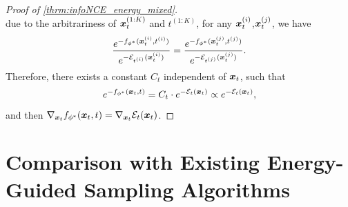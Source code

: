 \begin{proof}[Proof of \cref{thrm:infoNCE_energy_mixed}]
\begin{equation*}
\end{equation*}
due to the arbitrariness of ${\bm{x}}_t^{(1:K)}$ and $t^{(1:K)}$, for any ${\bm{x}}_t^{(i)}$,${\bm{x}}_t^{(j)}$, we have
\begin{equation*}
    \frac{e^{-f_{\phi^*}({\bm{x}}_t^{(i)},t^{(i)})}}{e^{-{\mathcal{E}}_{t^{(i)}}({\bm{x}}_t^{(i)})}} = \frac{e^{-f_{\phi^*}({\bm{x}}_t^{(j)},t^{(j)})}}{e^{-{\mathcal{E}}_{t^{(j)}}({\bm{x}}_t^{(j)})}}.
\end{equation*}
Therefore, there exists a constant $C_t$ independent of ${\bm{x}}_t$, such that
\begin{equation*}
    e^{-f_{\phi^*}({\bm{x}}_t,t)} = C_t \cdot e^{-{\mathcal{E}}_t({\bm{x}}_t)} \propto e^{-{\mathcal{E}}_t({\bm{x}}_t)},
\end{equation*}
and then $\nabla_{{\bm{x}}_t}f_{\phi^*}({\bm{x}}_t,t) = \nabla_{{\bm{x}}_t}{\mathcal{E}}_t({\bm{x}}_t)$.
\end{proof}



\section{Comparison with Existing Energy-Guided Sampling Algorithms}
\label{appendix:relationship}

\begin{table}[t]
    \vspace{-.1in}
    \centering
    \caption{\small{Comparison between energy-guided sampling algorithms.}}
    \vskip 0.1in
    \begin{small}
    \end{small}
    \label{tab:comparison_appendix}
\end{table}

